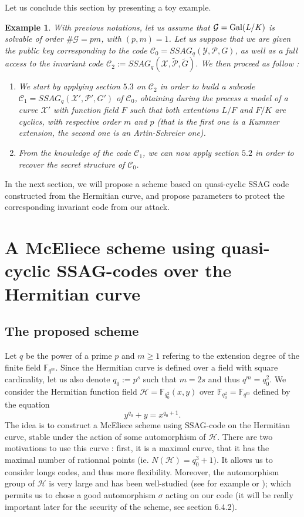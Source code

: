 \documentclass[10pt]{article}
\newtheorem{expl}[thm]{Example}
\newcommand{\s}{\vspace{0.3cm}}
\newcommand{\C}{\mathcal{C}}
\newcommand{\fqm}{\mathbb{F}_{q^m}}
\newcommand{\X}{\mathcal{X}}
\newcommand{\Y}{\mathcal{Y}}
\newcommand{\PR}{\mathcal{P}}
\newcommand{\G}{\mathcal{G}}
\begin{document}
Let us conclude this section by presenting a toy example.

\begin{expl} With previous notations, let us assume that $\G=\rm Gal(\it L/K)$ is solvable of order $\#\G = pm$, with $(p,m)=1$. Let us suppose that we are given the public key corresponding to the code $\C_0 = SSAG_q(\Y,\PR,G)$, as well as a full access to the invariant code $\C_2 := SSAG_q(\X,\tilde{\PR},\tilde{G})$. We then proceed as follow : 
\begin{enumerate}
\item[1.] We start by applying section $5.3$ on $\C_2$ in order to build a subcode $\C_1 = SSAG_q(\X',\PR',G')$ of $\C_0$, obtaining during the process a model of a curve $\X'$ with function field $F$ such that both extentions $L/F$ and $F/K$ are cyclics, with respective order $m$ and $p$ (that is the first one is a Kummer extension, the second one is an Artin-Schreier one).
\item[2.] From the knowledge of the code $\C_1$, we can now apply section $5.2$ in order to recover the secret structure of $\C_0$.
\end{enumerate}
\end{expl}

\s

In the next section, we will propose a scheme based on quasi-cyclic SSAG code constructed from the Hermitian curve, and propose parameters to protect the corresponding invariant code from our attack.

\s

\section{A McEliece scheme using quasi-cyclic SSAG-codes over the Hermitian curve}

\s

\subsection{The proposed scheme}

\s

Let $q$ be the power of a prime $p$ and $m \geq 1$ refering to the extension degree of the finite field $\fqm$. Since the Hermitian curve is defined over a field with square cardinality, let us also denote $q_0:=p^s$ such that $m=2s$ and thus $q^m = q_0^2$. We consider the Hermitian function field $\mathcal{H} = \mathbb{F}_{q_0^2}(x,y)$ over $\mathbb{F}_{q_0^2}=\fqm$ defined by the equation
\[y^{q_0}+y=x^{q_0+1}.\]
The idea is to construct a McEliece scheme using SSAG-code on the Hermitian curve, stable under the action of some automorphism of $\mathcal{H}$. There are two motivations to use this curve : first, it is a maximal curve, that it has the maximal number of rationnal points (ie. $N(\mathcal{H})=q_0^3+1)$. It allows us to consider longs codes, and thus more flexibility. Moreover, the automorphism group of $\mathcal{H}$ is very large and has been well-studied (see for example \cite{Sti} or \cite{Gar}); which permits us to chose a good automorphism $\sigma$ acting on our code (it will be really important later for the security of the scheme, see section 6.4.2). 
\end{document}
